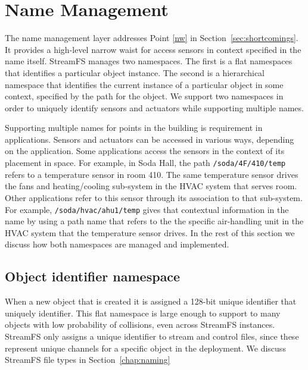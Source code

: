 \section{Name Management}
The name management layer addresses Point \ref{nw} in Section~\ref{sec:shortcomings}.  It provides a high-level
narrow waist for access sensors in context specified in the name itself.
StreamFS manages two namespaces.  The first is a flat namespaces that identifies a particular
object instance.  The second is a hierarchical namespace that identifies the current instance
of a particular object in some context, specified by the path for the object.  
We support two namespaces in order to uniquely identify sensors and actuators while supporting multiple names.

Supporting multiple names for points in the building is requirement in applications.  Sensors and actuators can be accessed in various 
ways, depending on the application.  Some applications access the sensors in the context of its placement 
in space.  For example, in Soda Hall, the path \texttt{/soda/4F/410/temp} refers to a temperature sensor in room 410.  
The same temperature sensor drives the fans and heating/cooling sub-system in the HVAC system that serves room.
Other applications refer to this sensor through its association to that sub-system.  For example,
\texttt{/soda/hvac/ahu1/temp} gives that contextual information in the name by using a path name that refers to the the specific
air-handling unit in the HVAC system that the temperature sensor drives.
In the rest of this section we discuss how both namespaces are managed and implemented.

\subsection{Object identifier namespace}

When a new object that is created it is assigned a 128-bit unique identifier that uniquely identifier. %
This flat namespace is large enough to support to many objects with low probability of collisions, even across
StreamFS instances.
StreamFS only assigns a unique identifier to stream and control files, since these represent unique channels for a specific 
object in the deployment.  We discuss StreamFS file types in Section~\ref{chap:naming}


